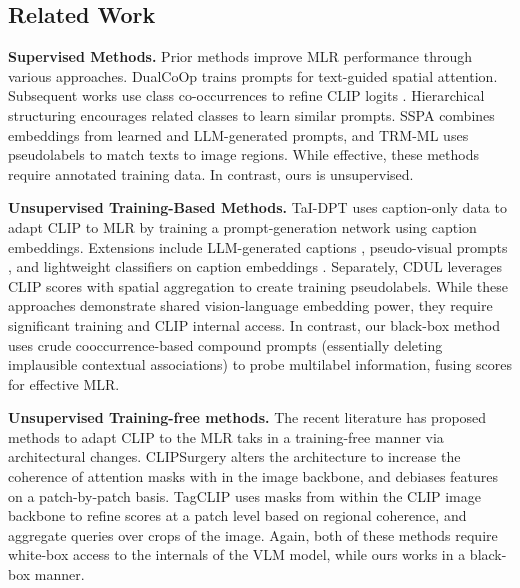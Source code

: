 \subsection{Related Work}
\label{sec:related}




\noindent \textbf{Supervised Methods.} 
Prior methods improve MLR performance through various approaches. DualCoOp \cite{DualCoOp,DualCoOp++} trains prompts for text-guided spatial attention. Subsequent works use class co-occurrences to refine CLIP logits \cite{CoocGCN,HSPNet}. Hierarchical structuring \cite{HSPNet} encourages related classes to learn similar prompts. SSPA \cite{SSPA} combines embeddings from learned and LLM-generated prompts, and TRM-ML \cite{TRM-ML} uses pseudolabels to match texts to image regions. While effective, these methods require annotated training data. In contrast, ours is unsupervised.



\noindent \textbf{Unsupervised Training-Based Methods.} 
TaI-DPT \cite{TaI-DPT} uses caption-only data to adapt CLIP to MLR by training a prompt-generation network using caption embeddings. Extensions include LLM-generated captions \cite{DataFreeMLR}, pseudo-visual prompts \cite{TaiPlusPlus}, and lightweight classifiers on caption embeddings \cite{CoMC, TaI-Adapter}. Separately, CDUL \cite{CDUL} leverages CLIP scores with spatial aggregation to create training pseudolabels. While these approaches demonstrate shared vision-language embedding power, they require significant training and CLIP internal access. In contrast, our black-box method uses crude cooccurrence-based compound prompts (essentially deleting implausible contextual associations) to probe multilabel information, fusing scores for effective MLR.








\noindent\textbf{Unsupervised Training-free methods.} The recent literature has proposed methods to adapt CLIP to the MLR taks in a training-free manner via architectural changes. CLIPSurgery \cite{CLIPSurgery} alters the architecture to increase the coherence of attention masks with in the image backbone, and debiases features on a patch-by-patch basis. TagCLIP \cite{TagCLIP} uses masks from within the CLIP image backbone to refine scores at a patch level based on regional coherence, and aggregate queries over crops of the image. Again, both of these methods require white-box access to the internals of the VLM model, while ours works in a black-box manner. %

